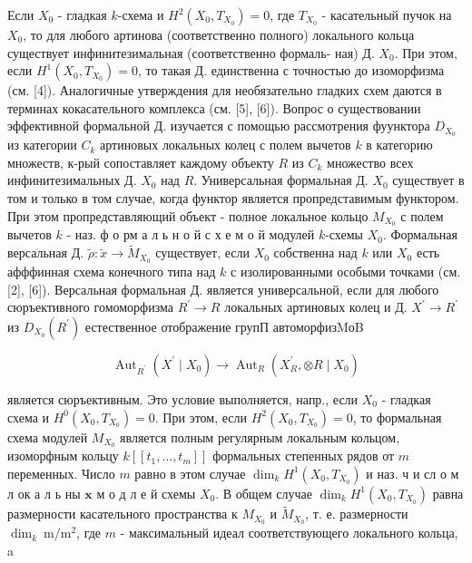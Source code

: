 \documentclass[10pt]{article}
\begin{document}
Если $X_{0}$ - гладкая $k$-схема и $H^{2}\left(X_{0}, T_{X_{0}}\right)=0$, где $T_{X_{0}}$ - касательный пучок на $X_{0}$, то для любого артинова (соответственно полного) локального кольца существует инфинитезимальная (соответственно формаль- ная) Д. $X_{0}$. При этом, если $H^{1}\left(X_{0}, T_{X_{0}}\right)=0$, то такая Д. единственна с точностью до изоморфизма (см. [4]). Аналогичные утверждения для необязательно гладких схем даются в терминах кокасательного комплекса (см. [5], [6]). Вопрос о существовании эффективной формальной Д. изучается с помощью рассмотрения фуунктора $D_{X_{0}}$ из категории $C_{k}$ артиновых локальных колец с полем вычетов $k$ в категорию множеств, к-рый сопоставляет каждому объекту $R$ из $C_{k}$ множество всех инфинитезимальных Д. $X_{0}$ над $R$. Универсальная формальная Д. $X_{0}$ существует в том и только в том случае, когда функтор является пропредставимым функтором. При этом пропредставляющий объект - полное локальное кольцо $M_{X_{0}}$ с полем вычетов $k$ - наз. ф о рм а л ь н о й с х е м о й модулей $k$-схемы $X_{0}$. Формальная версальная Д. $\tilde{\rho}: \tilde{x} \rightarrow \tilde{M}_{X_{0}}$ существует, если $X_{0}$ собственна над $k$ или $X_{0}$ есть афффинная схема конечного типа над $k$ с изолированными особыми точками (см. [2], [6]). Версальная формальная Д. является универсальной, если для любого сюръективного гомоморфизма $R^{\prime} \rightarrow R$ локальных артиновых колец и Д. $X^{\prime} \rightarrow R^{\prime}$ из $D_{X_{0}}\left(R^{\prime}\right)$ естественное отображение групП автоморфизMоB



\[

\operatorname{Aut}_{R^{\prime}}\left(X^{\prime} \mid X_{0}\right) \rightarrow \operatorname{Aut}_{R}\left(X_{R}^{\prime}, \otimes R \mid X_{0}\right)

\]



является сюръективным. Это условие выполняется, напр., если $X_{0}$ - гладкая схема и $H^{0}\left(X_{0}, T_{X_{0}}\right)=0$. При этом, если $H^{2}\left(X_{0}, T_{X_{0}}\right)=0$, то формальная схема модулей $M_{X_{0}}$ является полным регулярным локальным кольцом, изоморфным кольцу $k\left[\left[t_{1}, \ldots, t_{m}\right]\right]$ формальных степенных рядов от $m$ переменных. Число $m$ равно в этом случае $\operatorname{dim}_{k} H^{1}\left(X_{0}, T_{X_{0}}\right)$ и наз. ч и сл о м л ок а л ь ны $\mathbf{x}$ м о д л е й схемы $X_{0}$. В общем случае $\operatorname{dim}_{k} H^{1}\left(X_{0}, T_{X_{0}}\right)$ равна размерности касательного пространства к $M_{X_{0}}$ и $\tilde{M}_{X_{0}}$, т. е. размерности $\operatorname{dim}_{k} \mathrm{~m} / \mathrm{m}^{2}$, где $m$ - максимальный идеал соответствующего локального кольца, a
\end{document}
